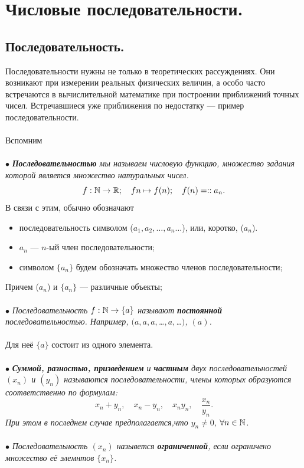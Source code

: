 \chapter{Числовые последовательности.}
\section{Последовательность.}
Последовательности нужны не только в теоретических рассуждениях. Они возникают при измерении реальных физических величин, а особо часто встречаются в вычислительной математике при построении приближений точных чисел. Встречавшиеся уже приближения по недостатку --- пример последовательности.\\\\
Вспомним\\\\
$\bullet$ \textit{\textbf{Последовательностью} мы называем числовую функцию, множество задания которой является множество натуральных чисел.}
$$f:\mathbb{N}\rightarrow \mathbb{R} ;\quad fn\mapsto f(n);\quad  f(n)=::a_n.$$
В связи с этим, обычно обозначают 
\begin{itemize}
	\item последовательность символом ($a_1,a_2,\ldots,a_n\ldots$), или, коротко, ($a_n$).
	\item $a_n$ --- $n$-ый член последовательности;
	\item символом $\{a_n\}$ будем обозначать множество членов последовательности;
\end{itemize}
Причем ($a_n$) и $\{a_n\}$ --- различные объекты;\\\\
$\bullet$ \textit{Последовательность $f:\mathbb{N}\rightarrow \{ a \}$ называют \textbf{постоянной} последовательностью. Например, $(a,a,a,$\ldots$,a,$\ldots$)$, $(a)$.}\\\\
Для неё $\{a\}$ состоит из одного элемента.\\\\
$\bullet$ \textit{\textbf{Суммой, разностью, призведением} и \textbf{частным} двух последовательностей $(x_n)$ и $(y_n)$ называются последовательности, члены которых образуются соответственно по формулам:
	$$x_n+y_n,\quad x_n-y_n,\quad x_ny_n,\quad \dfrac{x_n}{y_n}.$$ При этом в последнем случае предполагается,что $y_n\neq 0$, $\forall n \in \mathbb{N}$.}\\\\
$\bullet$ \textit{Последовательность $(x_n)$ назывется \textbf{ограниченной}, если ограничено множество её элемнтов $\{ x_n \}$.}\\\\
